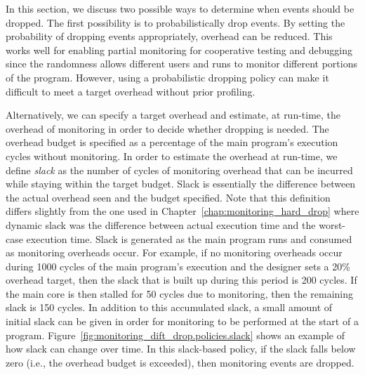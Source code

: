 In this section, we discuss two possible ways to determine when events should
be dropped.  The first possibility is to probabilistically drop events. By
setting the probability of dropping events appropriately, overhead can be
reduced. This works well for enabling partial monitoring for cooperative
testing and debugging since the randomness allows different users and runs to
monitor different portions of the program. However, using a probabilistic
dropping policy can make it difficult to meet a target overhead without prior
profiling.

Alternatively, we can specify a target overhead and estimate, at run-time, the
overhead of monitoring in order to decide whether dropping is needed.  The
overhead budget is specified as a percentage of the main program's execution
cycles without monitoring. In order to estimate the overhead at run-time, we
define \emph{slack} as the number of cycles of monitoring overhead that can be
incurred while staying within the target budget. Slack is essentially the
difference between the actual overhead seen and the budget specified. Note that
this definition differs slightly from the one used in
Chapter~\ref{chap:monitoring_hard_drop} where dynamic slack was the difference
between actual execution time and the worst-case execution time. Slack is
generated as the main program runs and consumed as monitoring overheads occur.
For example, if no monitoring overheads occur during 1000 cycles of the main
program's execution and the designer sets a 20\% overhead target, then the
slack that is built up during this period is 200 cycles. If the main core is
then stalled for 50 cycles due to monitoring, then the remaining slack is 150
cycles.  In addition to this accumulated slack, a small amount of initial slack
can be given in order for monitoring to be performed at the start of a program.
Figure~\ref{fig:monitoring_dift_drop.policies.slack} shows an example of how
slack can change over time.  In this slack-based policy, if the slack falls
below zero (i.e., the overhead budget is exceeded), then monitoring events are
dropped.

